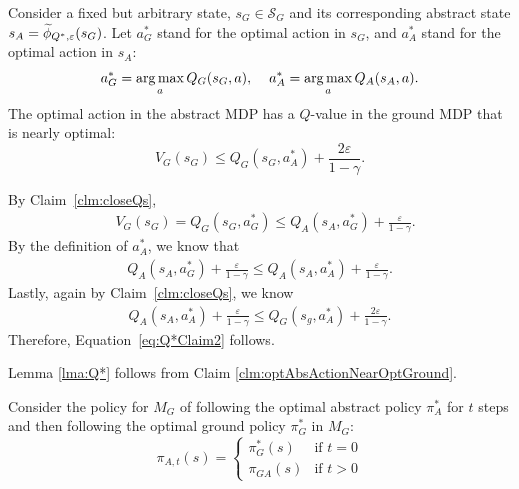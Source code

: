 \begin{clm}
\label{clm:optAbsActionNearOptGround}

Consider a fixed but arbitrary state, $s_G \in \mathcal{S}_G$ and its corresponding abstract state $s_A=\widetilde \phi_{Q^*,\varepsilon}(s_G)$.
Let $a^*_G$ stand for the optimal action in $s_G$, and $a^*_A$ stand for the optimal action in $s_A$:
\begin{align*}
a^*_G = \operatorname*{arg\,max}_a Q_G(s_G, a), \hspace{4mm}
a^*_A = \operatorname*{arg\,max}_a Q_A(s_A, a).
\end{align*}
The optimal action in the abstract MDP has a $Q$-value in the ground MDP that is nearly optimal:
\begin{equation}
\label{eq:Q*Claim2}
V_G(s_G) \leq Q_G(s_G, a^*_A) + \frac{2\varepsilon}{1-\gamma}.
\end{equation}
\end{clm}
\noindent By Claim~\ref{clm:closeQs},
\begin{align}
&V_G(s_G) = Q_G(s_G, a^*_G) \leq Q_A(s_A, a^*_G) + \frac{\varepsilon}{1-\gamma}.
\label{eq:Q*OptActionResult}
\end{align}
By the definition of $a^*_A$, we know that 
\begin{align}
Q_A(s_A, a^*_G) + \frac{\varepsilon}{1-\gamma} \leq Q_A(s_A, a^*_A) + \frac{\varepsilon}{1-\gamma}.
\end{align}
Lastly, again by Claim~\ref{clm:closeQs}, we know
\begin{align}
Q_A(s_A, a^*_A) + \frac{\varepsilon}{1-\gamma} \leq Q_G(s_g, a^*_A) + \frac{2\varepsilon}{1-\gamma}.
\end{align}
Therefore, Equation~\ref{eq:Q*Claim2} follows.

\begin{clm}
Lemma \ref{lma:Q*} follows from Claim \ref{clm:optAbsActionNearOptGround}.
\label{clm:lmaFromClm}
\end{clm}

Consider the policy for $M_G$ of following the optimal abstract policy $\pi^*_A$ for $t$ steps and then following the optimal ground policy $\pi^*_G$ in $M_G$:
\begin{equation}
\pi_{A,t}(s)=
\begin{cases}
\pi_G^*(s) &\text{if } t= 0\\
\pi_{GA}(s) &\text{if } t > 0
\end{cases}
\end{equation}

